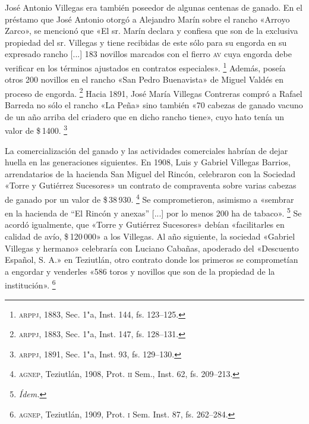 \documentclass[14pt,twoside,final]{extbook} %
\let\oldfootnote\footnote
\renewcommand\footnote[1]{%
\oldfootnote{\hspace{1mm}#1}}
\begin{document}
José Antonio Villegas era también poseedor de algunas centenas de ganado. En el préstamo que José Antonio otorgó a Alejandro Marín sobre el rancho «Arroyo Zarco», se mencionó que «El sr. Marín declara y confiesa que son de la exclusiva propiedad del sr. Villegas y tiene recibidas de este sólo para su engorda en su expresado rancho [...] 183 novillos marcados con el fierro \textsc{av} cuya engorda debe verificar en los términos ajustados en contratos especiales».\footnote{\textsc{arppj}, 1883, Sec. 1"a, Inst. 144, fs. 123--125.} Además, poseía otros 200 novillos en el rancho «San Pedro Buenavista» de Miguel Valdés en proceso de engorda.\footnote{\textsc{arppj}, 1883, Sec. 1"a, Inst. 147, fs. 128--131.} Hacia 1891, José María Villegas Contreras compró a Rafael Barreda no sólo el rancho «La Peña» sino también «70 cabezas de ganado vacuno de un año arriba del criadero que en dicho rancho tiene», cuyo hato tenía un valor de \$\,1400.\footnote{\textsc{arppj}, 1891, Sec. 1"a, Inst. 93, fs. 129--130.}

La comercialización del ganado y las actividades comerciales habrían de dejar huella en las generaciones siguientes. En 1908, Luis y Gabriel Villegas Barrios, arrendatarios de la hacienda San Miguel del Rincón, celebraron con la Sociedad «Torre y Gutiérrez Sucesores» un contrato de compraventa sobre varias cabezas de ganado por un valor de \$\,38\,930.\footnote{\textsc{agnep}, Teziutlán, 1908, Prot. \textsc{ii} Sem., Inst. 62, fs. 209--213.} Se comprometieron, asimismo a «sembrar en la hacienda de ``El Rincón y anexas'' [...] por lo menos 200 ha de tabaco».\footnote{\em Ídem.} Se acordó igualmente, que «Torre y Gutiérrez Sucesores» debían «facilitarles en calidad de avío, \$\,120\,000» a los Villegas. Al año siguiente, la sociedad «Gabriel Villegas y hermano» celebraría con Luciano Cabañas, apoderado del «Descuento Español, S. A.» en Teziutlán, otro contrato donde los primeros se comprometían a engordar y venderles «586 toros y novillos que son de la propiedad de la institución».\footnote{\textsc{agnep}, Teziutlán, 1909, Prot. \textsc{i} Sem. Inst. 87, fs. 262--284.}
\end{document}
